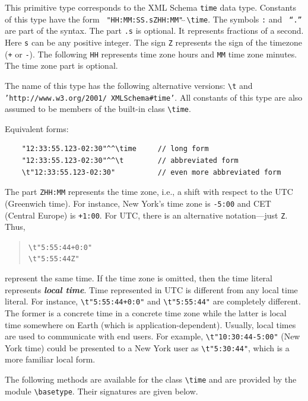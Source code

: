 \documentclass[11pt]{article}
\newcommand{\bs}{\textbackslash}
\begin{document}
\index{datatype!\bs{}time}
This primitive type corresponds to the XML Schema {\tt time} data type.
Constants of this type have the form {\tt
  "HH:MM:SS.sZHH:MM"$\hat{~}\hat{~}$\bs{}time}.  The symbols {\tt :} and {\tt
  ``.''}  are part of the syntax. The part {\tt .s} is optional. It represents
fractions of a second. Here {\tt s} can be any positive integer. The sign
{\tt Z} represents the sign of the timezone ({\tt +} or {\tt -}). The
following {\tt HH} represents time zone hours and {\tt MM} time zone
minutes. The time zone part is optional.


\index{class!\bs{}time}
The name of this type has the following alternative versions:
{\tt \bs{}t} and  {\tt 'http://www.w3.org/2001/ XMLSchema\#time'}. 
All constants of this type are also assumed to be members of the built-in
class {\tt \bs{}time}. 

\noindent
Equivalent forms:
\begin{verbatim}
    "12:33:55.123-02:30"^^\time     // long form
    "12:33:55.123-02:30"^^\t        // abbreviated form
    \t"12:33:55.123-02:30"          // even more abbreviated form
\end{verbatim}

The part \texttt{ZHH:MM} represents the time zone, i.e., a shift with
respect to the UTC (Greenwich time). For instance, New York's time zone is
\texttt{-5:00} and CET (Central Europe) is \texttt{+1:00}.  For UTC, there
is an alternative notation---just \texttt{Z}. Thus,
\begin{quote}
 \verb|\t"5:55:44+0:0"|
 \\
 \verb|\t"5:55:44Z"| 
\end{quote}
represent the same time.  If the time zone is omitted, then the
time literal represents \emph{\textbf{local time}}.
Time represented in UTC is different from any local time literal.
For instance, \verb|\t"5:55:44+0:0"| and
\verb|\t"5:55:44"| are completely different. The former is a
concrete time in a concrete time zone while the latter is local time
somewhere on Earth (which is application-dependent).
Usually, local times are used to communicate with end users.
For example, \verb|\t"10:30:44-5:00"| (New York time) could be
presented to a New York user as \verb|\t"5:30:44"|, which is a
more familiar local form.

The following methods are available for the class {\tt \bs{}time} and are
provided by the module {\tt \bs{}basetype}.  Their signatures are given below.
\end{document}
